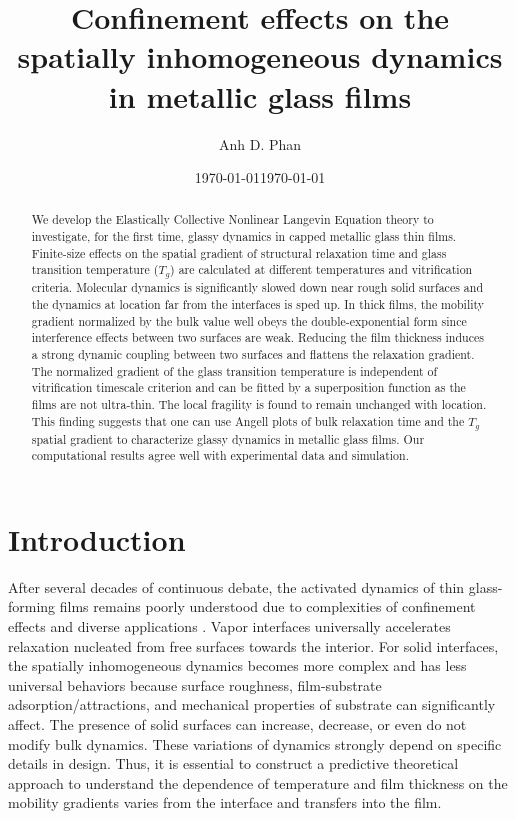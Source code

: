 \documentclass[twocolumn,preprintnumbers,amsmath,amssymb,superscriptaddress]{revtex4}
\begin{document}
\title{Confinement effects on the spatially inhomogeneous dynamics in  metallic glass films}%
\author{Anh D. Phan}
\date{\today}

\date{\today}

\begin{abstract}
We develop the Elastically Collective Nonlinear Langevin Equation theory to investigate, for the first time, glassy dynamics in capped metallic glass thin films. Finite-size effects on the spatial gradient of structural relaxation time and glass transition temperature ($T_g$) are calculated at different temperatures and vitrification criteria. Molecular dynamics is significantly slowed down near rough solid surfaces and the dynamics at location far from the interfaces is sped up. In thick films, the mobility gradient normalized by the bulk value well obeys the double-exponential form since interference effects between two surfaces are weak. Reducing the film thickness induces a strong dynamic coupling between two surfaces and flattens the relaxation gradient. The normalized gradient of the glass transition temperature is independent of vitrification timescale criterion and can be fitted by a superposition function as the films are not ultra-thin. The local fragility is found to remain unchanged with location. This finding suggests that one can use Angell plots of bulk relaxation time and the $T_g$ spatial gradient to characterize glassy dynamics in metallic glass films. Our computational results agree well with experimental data and simulation. 
\end{abstract}

\maketitle
\section{Introduction}
After several decades of continuous debate, the activated dynamics of thin glass-forming films remains poorly understood due to complexities of  confinement effects and diverse applications \cite{3,4,8,14,20,21,22,23,24,17,15}. Vapor interfaces universally accelerates relaxation nucleated from free surfaces towards the interior. For solid interfaces, the spatially inhomogeneous dynamics becomes more complex and has less universal behaviors because surface roughness, film-substrate adsorption/attractions, and mechanical properties of substrate can significantly affect. The presence of solid surfaces can increase, decrease, or even do not modify bulk dynamics. These variations of dynamics strongly depend on specific details in design. Thus, it is essential to construct a predictive theoretical approach to understand the dependence of temperature and film thickness on the mobility gradients varies from the interface and transfers into the film.
\end{document}
